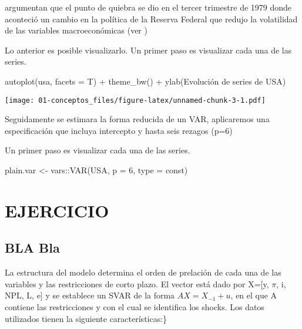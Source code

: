 \documentclass[
]{book}
\newenvironment{Shaded}{\begin{snugshade}}{\end{snugshade}}
\newcommand{\AttributeTok}[1]{\textcolor[rgb]{0.77,0.63,0.00}{#1}}
\newcommand{\DecValTok}[1]{\textcolor[rgb]{0.00,0.00,0.81}{#1}}
\newcommand{\FunctionTok}[1]{\textcolor[rgb]{0.00,0.00,0.00}{#1}}
\newcommand{\NormalTok}[1]{#1}
\newcommand{\OtherTok}[1]{\textcolor[rgb]{0.56,0.35,0.01}{#1}}
\newcommand{\SpecialCharTok}[1]{\textcolor[rgb]{0.00,0.00,0.00}{#1}}
\newcommand{\StringTok}[1]{\textcolor[rgb]{0.31,0.60,0.02}{#1}}
\begin{document}
\citet{Herwartz2016} argumentan que el punto de quiebra se dio en el tercer trimestre de 1979 donde aconteció un cambio en la política de la Reserva Federal que redujo la volatilidad de las variables macroeconómicas (ver \citet{Stock2003})

Lo anterior es posible visualizarlo.
Un primer paso es visualizar cada una de las series.

\begin{Shaded}
\begin{Highlighting}[]
\FunctionTok{autoplot}\NormalTok{(usa, }\AttributeTok{facets =}\NormalTok{ T) }\SpecialCharTok{+} \FunctionTok{theme\_bw}\NormalTok{() }\SpecialCharTok{+} \FunctionTok{ylab}\NormalTok{(}\StringTok{\textquotesingle{}Evolución de series de USA\textquotesingle{}}\NormalTok{)}
\end{Highlighting}
\end{Shaded}

\texttt{[image: 01-conceptos\_files/figure-latex/unnamed-chunk-3-1.pdf]}

Seguidamente se estimara la forma reducida de un VAR, aplicaremos una especificación que incluya intercepto y hasta seis rezagos (p=6)

Un primer paso es visualizar cada una de las series.

\begin{Shaded}
\begin{Highlighting}[]
\NormalTok{plain.var }\OtherTok{\textless{}{-}}\NormalTok{ vars}\SpecialCharTok{::}\FunctionTok{VAR}\NormalTok{(USA, }\AttributeTok{p =} \DecValTok{6}\NormalTok{, }\AttributeTok{type =} \StringTok{\textquotesingle{}const\textquotesingle{}}\NormalTok{)}
\end{Highlighting}
\end{Shaded}

\hypertarget{ejercicio}{%
\chapter{EJERCICIO}\label{ejercicio}}

\hypertarget{bla-bla}{%
\section{BLA Bla}\label{bla-bla}}

La estructura del modelo determina el orden de prelación de cada una de las variables y las restricciones de corto plazo.
El vector está dado por X={[}y, \(\pi\), i, NPL, L, e{]} y se establece un SVAR de la forma \(AX=X_{-1}+u\), en el que A contiene las restricciones y con el cual se identifica los shocks.
Los datos utilizados tienen la siguiente características:\}
\end{document}

